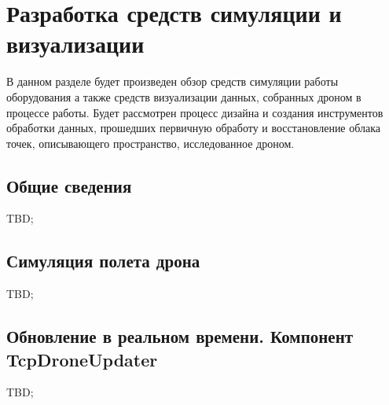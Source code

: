 \section{Разработка средств симуляции и визуализации}
\label{sec:simulation}

В данном разделе будет произведен обзор средств симуляции работы оборудования а также средств визуализации данных, собранных дроном в процессе работы. Будет рассмотрен процесс дизайна и создания инструментов обработки данных, прошедших первичную обработу и восстановление облака точек, описывающего пространство, исследованное дроном.

\subsection{Общие сведения}
\label{sub:simulation:general}

TBD;

\subsection{Симуляция полета дрона}
\label{sub:simulation:drone_simulation}

TBD;

\subsection{Обновление в реальном времени. Компонент TcpDroneUpdater}
\label{sub:simulation:realtime_updating}

TBD;
